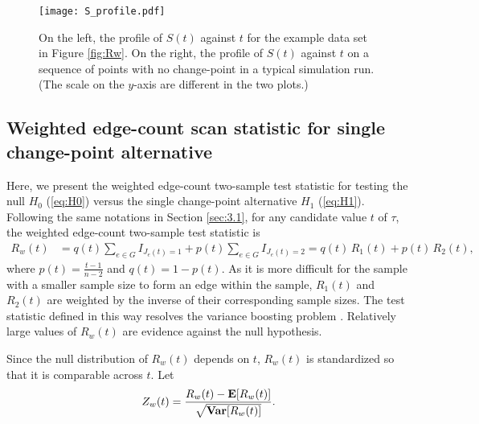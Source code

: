 \documentclass[arxiv, preprint]{imsart}
\numberwithin{equation}{section}
\theoremstyle{plain}
\begin{document}
\begin{figure}
  \centering
    \texttt{[image: S\_profile.pdf]}
    \vspace{-2mm}
  \caption{On the left, the profile of $S(t)$ against $t$ for the example data set in Figure \ref{fig:Rw}. On the right, the profile of $S(t)$ against $t$ on a sequence of points with no change-point in a typical simulation run. (The scale on the $y$-axis are different in the two plots.)}
  \label{fig:S_profile}
\end{figure}

\subsection{Weighted edge-count scan statistic for single change-point alternative}
\label{sec:3.2}

Here, we present the weighted edge-count two-sample test statistic for testing the null $H_0$ (\ref{eq:H0}) versus the single change-point alternative $H_1$ (\ref{eq:H1}). Following the same notations in Section \ref{sec:3.1}, for any candidate value $t$ of $\tau$, the weighted edge-count two-sample test statistic is 
\begin{align*} 
R_w(t) &  = q(t) \sum_{e \in G} I_{J_e(t)=1} + p(t) \sum_{e \in G} I_{J_e(t)=2}  = q(t) \, R_1(t) + p(t) \, R_2(t), 
\end{align*}
where $p(t) = \frac{t-1}{n-2}$ and $q(t)  = 1 - p(t)$. As it is more difficult for the sample with a smaller sample size to form an edge within the sample, $R_1(t)$ and $R_2(t)$ are weighted by the inverse of their corresponding sample sizes. The test statistic defined in this way resolves the variance boosting problem \citep{chen2017weighted}. Relatively large values of $R_w(t)$ are evidence against the null hypothesis. 

Since the null distribution of $R_w(t)$ depends on $t$, $R_w(t)$ is standardized so that it is comparable across $t$. Let
\begin{equation} 
\label{eq:Zw}
Z_w(t) = \frac{R_w(t) - \mathbf{E}[R_w(t)]}{\sqrt{\text{\bf Var}[R_w(t)]}}.
\end{equation}
\end{document}
